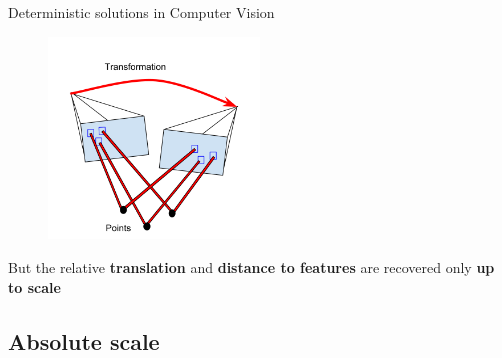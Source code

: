 \documentclass{beamer}
\begin{document}
\begin{frame}{Deterministic solutions in Computer Vision}

\begin{figure}
\centering
\includegraphics[width=0.5\textwidth]{images/directMethod.png}
\end{figure}



{\small
  But the relative \textbf{translation} and \textbf{distance to features} are recovered only \textbf{up to scale}
}

\end{frame}

\subsection{Absolute scale}
\end{document}
